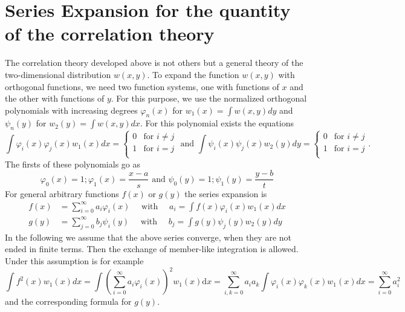 \documentclass{article}
\begin{document}
\section{Series Expansion for the quantity of the correlation theory}
The correlation theory developed above is not others but
a general theory of the two-dimensional distribution
$w(x,y)$.
To expand the function $w(x,y)$
with orthogonal functions, we need two function systems,
one with functions of $x$
and the other with functions of $y$.
For this purpose, we use the normalized
orthogonal polynomials with increasing degrees $\varphi_n(x)$
for $w_1(x)=\int w(x,y)dy$ and $\psi_n(y)$
for $w_2(y) = \int w(x,y)dx$. For this polynomial
exists the equations
\begin{equation}
    \int \varphi_i(x)
    \varphi_j(x) w_1(x)dx
    =\begin{cases}
    0 & \textrm{for } i\neq j\\
    1 &\textrm{for } i= j\\
    \end{cases}
    \textrm{ and } \int \psi_i(x)
    \psi_j(x) w_2(y)dy
    =\begin{cases}
    0 & \textrm{for } i\neq j\\
    1 &\textrm{for } i= j\\
    \end{cases}.
\end{equation}
The firsts of these polynomials go as
$$
\varphi_0(x) = 1;
\varphi_1(x) = \frac{x-a}{s} \textrm{ and }
\psi_0(y) = 1;
\psi_1(y) = \frac{y-b}{t}
$$
For general arbitrary functions $f(x)$
or $g(y)$ the series expansion is
\begin{equation}
\begin{aligned}
f(x) &=\sum_{i=0}^{\infty} a_{i} \varphi_{i}(x) \quad \text { with } \quad a_{i}=\int f(x) \varphi_{i}(x) w_{1}(x) d x \\
g(y) &=\sum_{j=0}^{\infty} b_{j} \psi_{i}(y) \quad \text { with } \quad b_{j}=\int g(y) \psi_{j}(y) w_{2}(y) d y
\end{aligned}
\end{equation}
In the following we assume that the above series converge, when
they are not ended in finite terms. Then the exchange of member-like integration is allowed.
Under this assumption is for example
$$
\int f^{2}(x) w_{1}(x) dx=\int\left(\sum_{i=0}^{\infty} a_{i} \varphi_{i}(x)\right)^{2}w_{1}(x) \mathrm{d} x=\sum_{i, k=0}^{\infty} a_{i} a_{k} \int \varphi_{i}(x) \varphi_{k}(x) w_{1}(x) d x=\sum_{i=0}^{\infty} a_{i}^{2}
$$
and the corresponding formula for $g(y)$.
\end{document}
